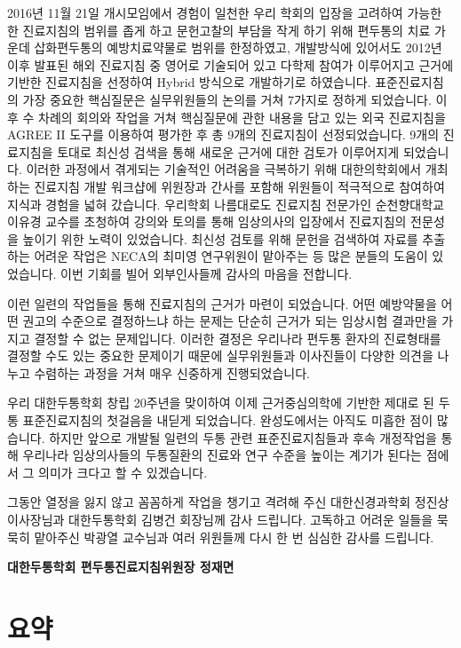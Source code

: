 \documentclass[]{book}
\begin{document}
2016년 11월 21일 개시모임에서 경험이 일천한 우리 학회의 입장을 고려하여 가능한 한 진료지침의 범위를 좁게 하고 문헌고찰의 부담을 작게 하기 위해 편두통의 치료 가운데 삽화편두통의 예방치료약물로 범위를 한정하였고, 개발방식에 있어서도 2012년 이후 발표된 해외 진료지침 중 영어로 기술되어 있고 다학제 참여가 이루어지고 근거에 기반한 진료지침을 선정하여 Hybrid 방식으로 개발하기로 하였습니다. 표준진료지침의 가장 중요한 핵심질문은 실무위원들의 논의를 거쳐 7가지로 정하게 되었습니다. 이후 수 차례의 회의와 작업을 거쳐 핵심질문에 관한 내용을 담고 있는 외국 진료지침을 AGREE II 도구를 이용하여 평가한 후 총 9개의 진료지침이 선정되었습니다. 9개의 진료지침을 토대로 최신성 검색을 통해 새로운 근거에 대한 검토가 이루어지게 되었습니다. 이러한 과정에서 겪게되는 기술적인 어려움을 극복하기 위해 대한의학회에서 개최하는 진료지침 개발 워크샵에 위원장과 간사를 포함해 위원들이 적극적으로 참여하여 지식과 경험을 넓혀 갔습니다. 우리학회 나름대로도 진료지침 전문가인 순천향대학교 이유경 교수를 초청하여 강의와 토의를 통해 임상의사의 입장에서 진료지침의 전문성을 높이기 위한 노력이 있었습니다. 최신성 검토를 위해 문헌을 검색하여 자료를 추출하는 어려운 작업은 NECA의 최미영 연구위원이 맡아주는 등 많은 분들의 도움이 있었습니다. 이번 기회를 빌어 외부인사들께 감사의 마음을 전합니다.

이런 일련의 작업들을 통해 진료지침의 근거가 마련이 되었습니다. 어떤 예방약물을 어떤 권고의 수준으로 결정하느냐 하는 문제는 단순히 근거가 되는 임상시험 결과만을 가지고 결정할 수 없는 문제입니다. 이러한 결정은 우리나라 편두통 환자의 진료형태를 결정할 수도 있는 중요한 문제이기 때문에 실무위원들과 이사진들이 다양한 의견을 나누고 수렴하는 과정을 거쳐 매우 신중하게 진행되었습니다.

우리 대한두통학회 창립 20주년을 맞이하여 이제 근거중심의학에 기반한 제대로 된 두통 표준진료지침의 첫걸음을 내딛게 되었습니다. 완성도에서는 아직도 미흡한 점이 많습니다. 하지만 앞으로 개발될 일련의 두통 관련 표준진료지침들과 후속 개정작업을 통해 우리나라 임상의사들의 두통질환의 진료와 연구 수준을 높이는 계기가 된다는 점에서 그 의미가 크다고 할 수 있겠습니다.

그동안 열정을 잃지 않고 꼼꼼하게 작업을 챙기고 격려해 주신 대한신경과학회 정진상 이사장님과 대한두통학회 김병건 회장님께 감사 드립니다. 고독하고 어려운 일들을 묵묵히 맡아주신 박광열 교수님과 여러 위원들께 다시 한 번 심심한 감사를 드립니다.

\textbf{대한두통학회 편두통진료지침위원장 정재면}

\mainmatter

\hypertarget{section-3}{%
\chapter{요약}\label{section-3}}
\end{document}
